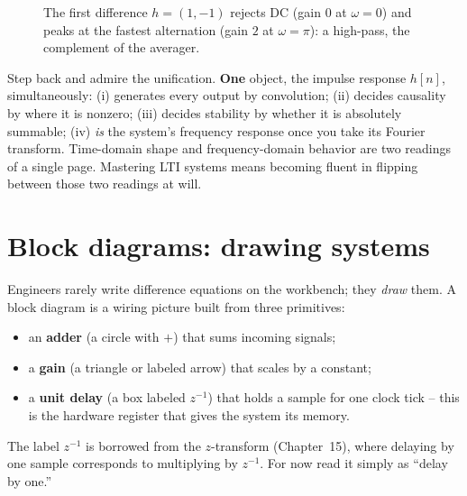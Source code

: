 \begin{figure}[H]
\centering
{}
\caption{The first difference $h=(1,-1)$ rejects DC (gain $0$ at $\omega=0$) and
peaks at the fastest alternation (gain $2$ at $\omega=\pi$): a high-pass,
the complement of the averager.}
\label{ch12:fig-diff-mag}
\end{figure}

\begin{aestheticbox}
Step back and admire the unification. \textbf{One} object, the impulse response
$h[n]$, simultaneously:
(i) generates every output by convolution;
(ii) decides causality by where it is nonzero;
(iii) decides stability by whether it is absolutely summable;
(iv) \emph{is} the system's frequency response once you take its Fourier
transform. Time-domain shape and frequency-domain behavior are two readings of a
single page. Mastering LTI systems means becoming fluent in flipping between
those two readings at will.
\end{aestheticbox}

\section{Block diagrams: drawing systems}
\label{ch12:block}

Engineers rarely write difference equations on the workbench; they \emph{draw}
them. A block diagram is a wiring picture built from three primitives:
\begin{itemize}
  \item an \textbf{adder} (a circle with $+$) that sums incoming signals;
  \item a \textbf{gain} (a triangle or labeled arrow) that scales by a constant;
  \item a \textbf{unit delay} (a box labeled $z^{-1}$) that holds a sample for
        one clock tick -- this is the hardware register that gives the system its
        memory.
\end{itemize}
The label $z^{-1}$ is borrowed from the $z$-transform (Chapter~15), where
delaying by one sample corresponds to multiplying by $z^{-1}$. For now read it
simply as ``delay by one.''

